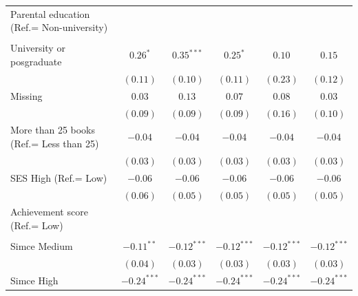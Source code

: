 \documentclass[
  12pt,
  letterpaper,
]{article}
\begin{document}
\begin{table}
{\begin{center}
{\begin{threeparttable}
\begin{tabular}{l c c c c c}
Parental education (Ref.= Non-university)           &               &               &               &               &               \\
                                                    &               &               &               &               &               \\
\quad University or posgraduate                     & $0.26^{*}$    & $0.35^{***}$  & $0.25^{*}$    & $0.10$        & $0.15$        \\
                                                    & $(0.11)$      & $(0.10)$      & $(0.11)$      & $(0.23)$      & $(0.12)$      \\
\quad Missing                                       & $0.03$        & $0.13$        & $0.07$        & $0.08$        & $0.03$        \\
                                                    & $(0.09)$      & $(0.09)$      & $(0.09)$      & $(0.16)$      & $(0.10)$      \\
More than 25 books (Ref.= Less than 25)             & $-0.04$       & $-0.04$       & $-0.04$       & $-0.04$       & $-0.04$       \\
                                                    & $(0.03)$      & $(0.03)$      & $(0.03)$      & $(0.03)$      & $(0.03)$      \\
SES High (Ref.= Low)                                & $-0.06$       & $-0.06$       & $-0.06$       & $-0.06$       & $-0.06$       \\
                                                    & $(0.06)$      & $(0.05)$      & $(0.05)$      & $(0.05)$      & $(0.05)$      \\
Achievement score (Ref.= Low)                       &               &               &               &               &               \\
                                                    &               &               &               &               &               \\
\quad Simce Medium                                  & $-0.11^{**}$  & $-0.12^{***}$ & $-0.12^{***}$ & $-0.12^{***}$ & $-0.12^{***}$ \\
                                                    & $(0.04)$      & $(0.03)$      & $(0.03)$      & $(0.03)$      & $(0.03)$      \\
\quad Simce High                                    & $-0.24^{***}$ & $-0.24^{***}$ & $-0.24^{***}$ & $-0.24^{***}$ & $-0.24^{***}$ \\

\end{tabular}
\end{threeparttable}}
\end{center}}
\end{table}
\end{document}
